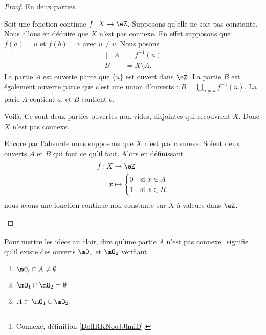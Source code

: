\begin{proof}
	En deux parties.
	\begin{subproof}
		\spitem[\( \Rightarrow\)]
		Soit une fonction continue \(f \colon X\to \eZ  \). Supposons qu'elle ne soit pas constante. Nous allons en déduire que \( X\) n'est pas connexe. En effet supposons que \( f(a)=u\) et \( f(b)=v\) avec \( u\neq v\). Nous posons
		\begin{equation}
			\begin{aligned}[]
				A & =f^{-1}(u)     \\
				B & =X\setminus A.
			\end{aligned}
		\end{equation}
		La partie \( A\) est ouverte parce que \( \{ u \}\) est ouvert dans \( \eZ\). La partie \( B\) est également ouverte parce que c'est une union d'ouverts :  \( B=\bigcup_{n\neq u}f^{-1}(n)\). La parie \( A\) contient \( a\), et \( B\) contient \( b\).

		Voilà. Ce sont deux parties ouvertes non vides, disjointes qui recouvrent \( X\). Donc \( X\) n'est pas connexe.

		\spitem[\( \Leftarrow\)]
		Encore par l'absurde nous supposons que \( X\) n'est pas connexe. Soient deux ouverts \( A\) et \( B\) qui font ce qu'il faut. Alors en définissant
		\begin{equation}
			\begin{aligned}
				f\colon X & \to \eZ                       \\
				x         & \mapsto \begin{cases}
					                    0 & \text{si } x\in A \\
					                    1 & \text{si }x\in B,
				                    \end{cases}
			\end{aligned}
		\end{equation}
		nous avons une fonction continue non constante sur \( X\) à valeurs dans \( \eZ\).
	\end{subproof}
\end{proof}

\begin{normaltext}      \label{NORMooSCAWooPFnrVj}
	Pour mettre les idées au clair, dire qu'une partie \( A\) n'est pas connexe\footnote{Connexe, définition \ref{DefIRKNooJJlmiD}.} signifie qu'il existe des ouverts \( \mO_1\) et \( \mO_2\) vérifiant
	\begin{enumerate}
		\item   \label{ITEMooRACDooKLaVXP}
		      \( \mO_i\cap A\neq\emptyset\)
		\item       \label{ITEMooNCQVooNjAYCT}
		      \( \mO_1\cap\mO_2=\emptyset\)
		\item       \label{ITEMooPIHJooNJYpQo}
		      \( A\subset  \mO_1\cup\mO_2  \).
	\end{enumerate}
\end{normaltext}

